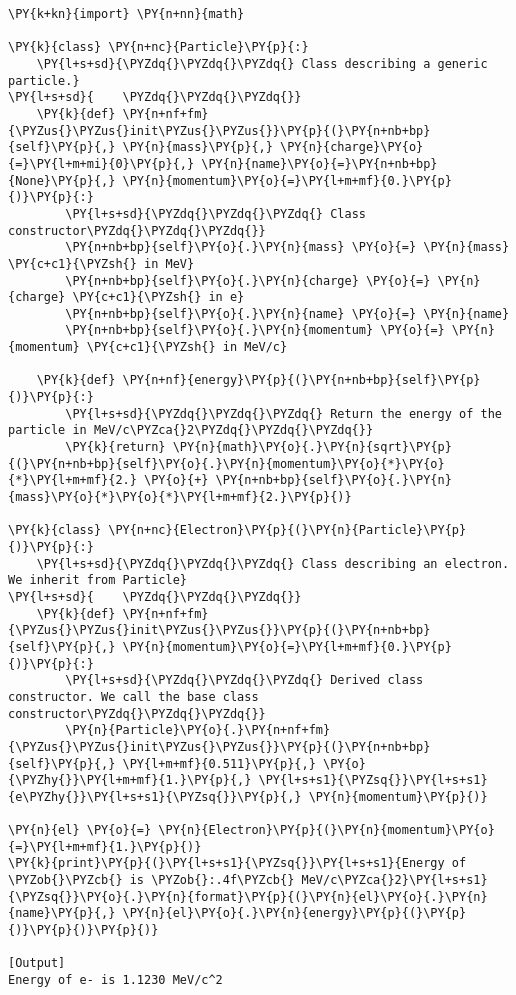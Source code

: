 \begin{Verbatim}[label=\makebox{\url{https://bitbucket.org/lbaldini/programming/src/tip/snippets/inheritance.py}},commandchars=\\\{\}]
\PY{k+kn}{import} \PY{n+nn}{math}

\PY{k}{class} \PY{n+nc}{Particle}\PY{p}{:}
    \PY{l+s+sd}{\PYZdq{}\PYZdq{}\PYZdq{} Class describing a generic particle.}
\PY{l+s+sd}{    \PYZdq{}\PYZdq{}\PYZdq{}}
    \PY{k}{def} \PY{n+nf+fm}{\PYZus{}\PYZus{}init\PYZus{}\PYZus{}}\PY{p}{(}\PY{n+nb+bp}{self}\PY{p}{,} \PY{n}{mass}\PY{p}{,} \PY{n}{charge}\PY{o}{=}\PY{l+m+mi}{0}\PY{p}{,} \PY{n}{name}\PY{o}{=}\PY{n+nb+bp}{None}\PY{p}{,} \PY{n}{momentum}\PY{o}{=}\PY{l+m+mf}{0.}\PY{p}{)}\PY{p}{:}
        \PY{l+s+sd}{\PYZdq{}\PYZdq{}\PYZdq{} Class constructor\PYZdq{}\PYZdq{}\PYZdq{}}
        \PY{n+nb+bp}{self}\PY{o}{.}\PY{n}{mass} \PY{o}{=} \PY{n}{mass} \PY{c+c1}{\PYZsh{} in MeV}
        \PY{n+nb+bp}{self}\PY{o}{.}\PY{n}{charge} \PY{o}{=} \PY{n}{charge} \PY{c+c1}{\PYZsh{} in e}
        \PY{n+nb+bp}{self}\PY{o}{.}\PY{n}{name} \PY{o}{=} \PY{n}{name}
        \PY{n+nb+bp}{self}\PY{o}{.}\PY{n}{momentum} \PY{o}{=} \PY{n}{momentum} \PY{c+c1}{\PYZsh{} in MeV/c}
    
    \PY{k}{def} \PY{n+nf}{energy}\PY{p}{(}\PY{n+nb+bp}{self}\PY{p}{)}\PY{p}{:}
        \PY{l+s+sd}{\PYZdq{}\PYZdq{}\PYZdq{} Return the energy of the particle in MeV/c\PYZca{}2\PYZdq{}\PYZdq{}\PYZdq{}}
        \PY{k}{return} \PY{n}{math}\PY{o}{.}\PY{n}{sqrt}\PY{p}{(}\PY{n+nb+bp}{self}\PY{o}{.}\PY{n}{momentum}\PY{o}{*}\PY{o}{*}\PY{l+m+mf}{2.} \PY{o}{+} \PY{n+nb+bp}{self}\PY{o}{.}\PY{n}{mass}\PY{o}{*}\PY{o}{*}\PY{l+m+mf}{2.}\PY{p}{)}
 
\PY{k}{class} \PY{n+nc}{Electron}\PY{p}{(}\PY{n}{Particle}\PY{p}{)}\PY{p}{:}
    \PY{l+s+sd}{\PYZdq{}\PYZdq{}\PYZdq{} Class describing an electron. We inherit from Particle}
\PY{l+s+sd}{    \PYZdq{}\PYZdq{}\PYZdq{}}
    \PY{k}{def} \PY{n+nf+fm}{\PYZus{}\PYZus{}init\PYZus{}\PYZus{}}\PY{p}{(}\PY{n+nb+bp}{self}\PY{p}{,} \PY{n}{momentum}\PY{o}{=}\PY{l+m+mf}{0.}\PY{p}{)}\PY{p}{:}
        \PY{l+s+sd}{\PYZdq{}\PYZdq{}\PYZdq{} Derived class constructor. We call the base class constructor\PYZdq{}\PYZdq{}\PYZdq{}}
        \PY{n}{Particle}\PY{o}{.}\PY{n+nf+fm}{\PYZus{}\PYZus{}init\PYZus{}\PYZus{}}\PY{p}{(}\PY{n+nb+bp}{self}\PY{p}{,} \PY{l+m+mf}{0.511}\PY{p}{,} \PY{o}{\PYZhy{}}\PY{l+m+mf}{1.}\PY{p}{,} \PY{l+s+s1}{\PYZsq{}}\PY{l+s+s1}{e\PYZhy{}}\PY{l+s+s1}{\PYZsq{}}\PY{p}{,} \PY{n}{momentum}\PY{p}{)}
        
\PY{n}{el} \PY{o}{=} \PY{n}{Electron}\PY{p}{(}\PY{n}{momentum}\PY{o}{=}\PY{l+m+mf}{1.}\PY{p}{)}
\PY{k}{print}\PY{p}{(}\PY{l+s+s1}{\PYZsq{}}\PY{l+s+s1}{Energy of \PYZob{}\PYZcb{} is \PYZob{}:.4f\PYZcb{} MeV/c\PYZca{}2}\PY{l+s+s1}{\PYZsq{}}\PY{o}{.}\PY{n}{format}\PY{p}{(}\PY{n}{el}\PY{o}{.}\PY{n}{name}\PY{p}{,} \PY{n}{el}\PY{o}{.}\PY{n}{energy}\PY{p}{(}\PY{p}{)}\PY{p}{)}\PY{p}{)}

[Output]
Energy of e- is 1.1230 MeV/c^2
\end{Verbatim}